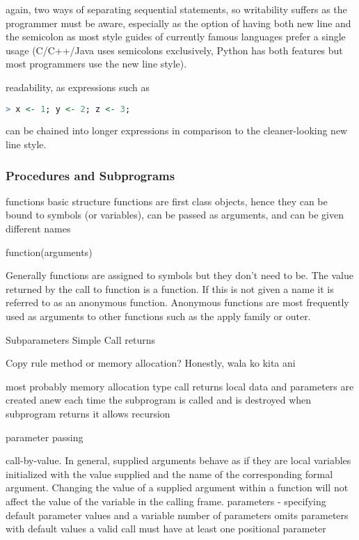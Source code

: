 \documentclass[12pt]{article}
\begin{document}
again, two ways of separating sequential statements, so writability suffers as the programmer must be aware, especially as the option of having both new line and the semicolon as most style guides of currently famous languages prefer a single usage (C/C++/Java uses semicolons exclusively, Python has both features but most programmers use the new line style).

readability, as expressions such as

\begin{lstlisting}[language=R, frame=none]
  > x <- 1; y <- 2; z <- 3;
\end{lstlisting}

can be chained into longer expressions in comparison to the cleaner-looking new line style.

\subsubsection{Procedures and Subprograms}
functions
basic structure
functions are first class objects, hence they can be bound to symbols (or variables), can be passed as arguments, and can be given different names

function(arguments)

Generally functions are assigned to symbols but they don’t need to be. The value returned by
the call to function is a function. If this is not given a name it is referred to as an anonymous
function. Anonymous functions are most frequently used as arguments to other functions such
as the apply family or outer.

Subparameters
Simple Call returns

Copy rule method or memory allocation?
Honestly, wala ko kita ani

most probably memory allocation type call returns
local data and parameters are created anew each time the subprogram is called and is destroyed when subprogram returns
it allows recursion

parameter passing

call-by-value. In general, supplied
arguments behave as if they are local variables initialized with the value supplied and the name
of the corresponding formal argument. Changing the value of a supplied argument within a
function will not affect the value of the variable in the calling frame.
parameters - specifying default parameter values and a variable number of parameters
omits parameters with default values
a valid call must have at least one positional parameter
\end{document}
